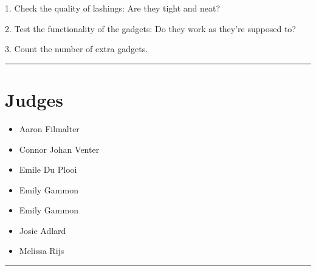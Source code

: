 \documentclass[10pt]{article}
\begin{document}
1. Check the quality of lashings: Are they tight and neat?

2. Test the functionality of the gadgets: Do they work as they're supposed to?

3. Count the number of extra gadgets.
\vspace{0.5cm}
	\hrule
	\vspace{0.5cm}
		\section*{\faUsers \: Judges}

		

	\begin{multicols}{2}

		\begin{itemize}
									\item Aaron Filmalter
									\item Connor Johan Venter
									\item Emile Du Plooi
									\item Emily Gammon
						\end{itemize}

		\vfill\null
		\columnbreak

		\begin{itemize}
									\item Emily Gammon
									\item Josie Adlard
									\item Melissa Rijs
						\end{itemize}

		\vfill\null

		\end{multicols}



			\vspace{0.5cm}
	\hrule
	\vspace{0.5cm}
\end{document}
